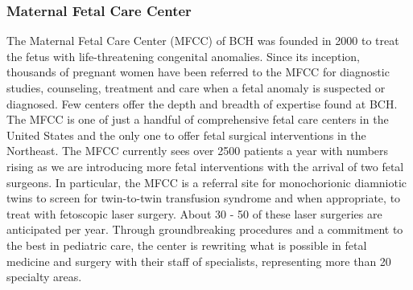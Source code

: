 \documentclass[11pt]{amsart}
\begin{document}
\hypertarget{x-maternal-fetal-care-center}{\subsubsection*{Maternal Fetal Care Center}}
The Maternal Fetal Care Center (MFCC) of BCH was founded in 2000 to treat the fetus with life-threatening congenital anomalies. Since its inception, thousands of pregnant women have been referred to the MFCC for diagnostic studies, counseling, treatment and care when a fetal anomaly is suspected or diagnosed. Few centers offer the depth and breadth of expertise found at BCH. The MFCC is one of just a handful of comprehensive fetal care centers in the United States and the only one to offer fetal surgical interventions in the Northeast. The MFCC currently sees over 2500 patients a year with numbers rising as we are introducing more fetal interventions with the arrival of two fetal surgeons. In particular, the MFCC is a referral site for monochorionic diamniotic twins to screen for twin-to-twin transfusion syndrome and when appropriate, to treat with fetoscopic laser surgery. About 30 - 50 of these laser surgeries are anticipated per year. Through groundbreaking procedures and a commitment to the best in pediatric care, the center is rewriting what is possible in fetal medicine and surgery with their staff of specialists, representing more than 20 specialty areas.
\end{document}
